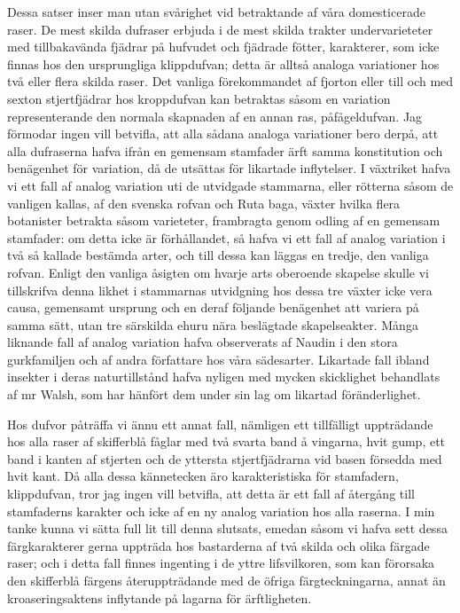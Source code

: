 Dessa satser inser man utan svårighet vid betraktande af våra domesticerade raser. De mest skilda dufraser erbjuda i de mest skilda trakter undervarieteter med tillbakavända fjädrar på hufvudet och fjädrade fötter, karakterer, som icke finnas hos den ursprungliga klippdufvan; detta är alltså analoga variationer hos två eller flera skilda raser. Det vanliga förekommandet af fjorton eller till och med sexton stjertfjädrar hos kroppdufvan kan betraktas såsom en variation representerande den normala skapnaden af en annan ras, påfågeldufvan. Jag förmodar ingen vill betvifla, att alla sådana analoga variationer bero derpå, att alla dufraserna hafva ifrån en gemensam stamfader ärft samma konstitution och benägenhet för variation, då de utsättas för likartade inflytelser. I växtriket hafva vi ett fall af analog variation uti de utvidgade stammarna, eller rötterna såsom de vanligen kallas, af den svenska rofvan och Ruta baga, växter hvilka flera botanister betrakta såsom varieteter, frambragta genom odling af en gemensam stamfader: om detta icke är förhållandet, så hafva vi ett fall af analog variation i två så kallade bestämda arter, och till dessa kan läggas en tredje, den vanliga rofvan. Enligt den vanliga åsigten om hvarje arts oberoende skapelse skulle vi tillskrifva denna likhet i stammarnas utvidgning hos dessa tre växter icke vera causa, gemensamt ursprung och en deraf följande benägenhet att variera på samma sätt, utan tre särskilda ehuru nära beslägtade skapelseakter. Många liknande fall af analog variation hafva observerats af Naudin i den stora gurkfamiljen och af andra författare hos våra sädesarter. Likartade fall ibland insekter i deras naturtillstånd hafva nyligen med mycken skicklighet behandlats af mr Walsh, som har hänfört dem under sin lag om likartad föränderlighet.

Hos dufvor påträffa vi ännu ett annat fall, nämligen ett tillfälligt uppträdande hos alla raser af skifferblå fåglar med två svarta band å vingarna, hvit gump, ett band i kanten af stjerten och de yttersta stjertfjädrarna vid basen försedda med hvit kant. Då alla dessa kännetecken äro karakteristiska för stamfadern, klippdufvan, tror jag ingen vill betvifla, att detta är ett fall af återgång till stamfaderns karakter och icke af en ny analog variation hos alla raserna. I min tanke kunna vi sätta full lit till denna slutsats, emedan såsom vi hafva sett dessa färgkarakterer gerna uppträda hos bastarderna af två skilda och olika färgade raser; och i detta fall finnes ingenting i de yttre lifsvilkoren, som kan förorsaka den skifferblå färgens återuppträdande med de öfriga färgteckningarna, annat än kroaseringsaktens inflytande på lagarna för ärftligheten.

